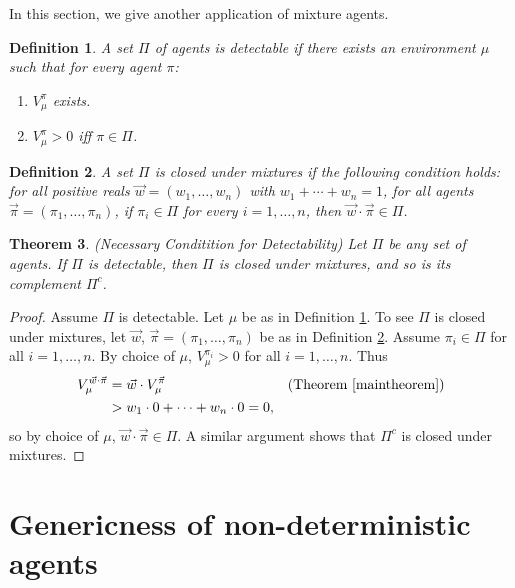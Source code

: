 \documentclass[twoside]{article}
\newtheorem{theorem}{Theorem}
\newtheorem{definition}[theorem]{Definition}
\begin{document}
In this section, we give another application of mixture agents.

\begin{definition}
\label{incentivizabilitydefn}
    A set $\Pi$ of agents is \emph{detectable} if there exists
    an environment $\mu$ such that for every agent $\pi$:
    \begin{enumerate}
        \item
        $V^\pi_\mu$ exists.
        \item
        $V^\pi_\mu>0$ iff $\pi\in\Pi$.
    \end{enumerate}
\end{definition}

\begin{definition}
\label{mixtureclosuredef}
    A set $\Pi$ is \emph{closed under mixtures} if the following
    condition holds: for all positive reals $\vec w=(w_1,\ldots,w_n)$
    with $w_1+\cdots+w_n=1$,
    for all agents $\vec\pi=(\pi_1,\ldots,\pi_n)$,
    if $\pi_i\in \Pi$ for every $i=1,\ldots,n$, then
    $\vec w\cdot\vec\pi\in\Pi$.
\end{definition}

\begin{theorem}
\label{closuretheorem}
    (Necessary Conditition for Detectability)
    Let $\Pi$ be any set of agents.
    If $\Pi$ is detectable, then $\Pi$ is closed under mixtures, and so
    is its complement $\Pi^c$.
\end{theorem}

\begin{proof}
    Assume $\Pi$ is detectable.
    Let $\mu$ be as in
    Definition \ref{incentivizabilitydefn}.
    To see $\Pi$ is closed under mixtures, let $\vec w$, $\vec\pi=(\pi_1,\ldots,\pi_n)$ be
    as in Definition \ref{mixtureclosuredef}.
    Assume $\pi_i\in\Pi$ for all $i=1,\ldots,n$.
    By choice of $\mu$, $V^{\pi_i}_\mu>0$ for all $i=1,\ldots,n$.
    Thus
    \begin{align*}
        V^{\vec w\cdot\vec\pi}_\mu
            &= \vec w\cdot V^{\vec\pi}_\mu
                &\mbox{(Theorem \ref{maintheorem})}\\
            &> w_1\cdot 0 + \cdots + w_n\cdot 0 = 0,
    \end{align*}
    so by choice of $\mu$, $\vec w\cdot \vec\pi\in \Pi$.
    A similar argument shows that $\Pi^c$ is closed under mixtures.
\end{proof}


\section{Genericness of non-deterministic agents}
\end{document}
